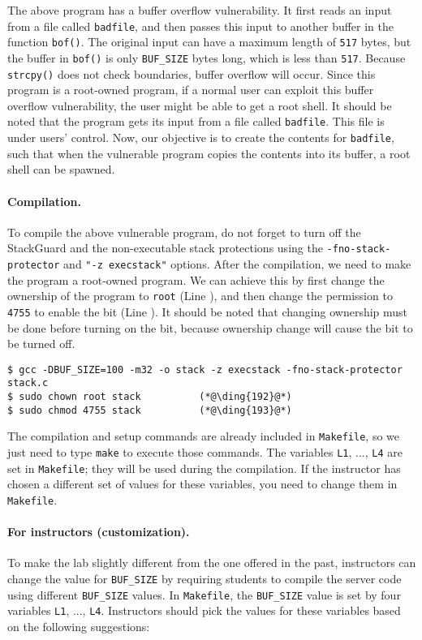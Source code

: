 The above program has a buffer overflow vulnerability. It first 
reads an input from a file called \texttt{badfile}, and then passes this
input to another buffer in the function {\tt bof()}. The 
original input can have a maximum length of \texttt{517} bytes, but the buffer
in {\tt bof()} is only \texttt{BUF\_SIZE} bytes long, which is less than
\texttt{517}. 
Because {\tt strcpy()} does not check
boundaries, buffer overflow will occur.
Since this program is a root-owned \setuid program, if a normal user can exploit
this buffer overflow vulnerability, the user might be 
able to get a root shell.
It should be noted that 
the program gets its input from a file called \texttt{badfile}. This file
is under users' control. Now, our objective is to 
create the contents for \texttt{badfile}, such that when the vulnerable program
copies the contents into its buffer, a root shell can be spawned.


\paragraph{Compilation.}
To compile the above vulnerable program, do not forget to 
turn off the StackGuard and the non-executable stack protections 
using the \texttt{-fno-stack-protector} and \texttt{"-z execstack"} options.
After the compilation, we need to make the program a
root-owned \setuid program. We can achieve this by first change the ownership of the program to
\texttt{root} (Line ), and then change the permission to \texttt{4755} to enable the
\setuid bit (Line ). It should be noted that changing ownership must be done before
turning on the \setuid bit, because ownership change will cause the \setuid bit to be turned
off.


\begin{lstlisting}
$ gcc -DBUF_SIZE=100 -m32 -o stack -z execstack -fno-stack-protector stack.c
$ sudo chown root stack          (*@\ding{192}@*)
$ sudo chmod 4755 stack          (*@\ding{193}@*)
\end{lstlisting}

The compilation and setup commands are already included in \texttt{Makefile}, 
so we just need to type \texttt{make} to execute those commands. 
The variables \texttt{L1}, ..., \texttt{L4} are 
set in \texttt{Makefile}; they will be used during the compilation. 
If the instructor has chosen a different set of values 
for these variables, you need to change them in \texttt{Makefile}.


\paragraph{For instructors (customization).}
To make the lab slightly different from the one offered in the past,
instructors can change the value for \texttt{BUF\_SIZE} by requiring 
students to compile the server code using different \texttt{BUF\_SIZE} values. 
In \texttt{Makefile}, the \texttt{BUF\_SIZE} value is set by
four variables \texttt{L1}, ..., \texttt{L4}. 
Instructors should pick the values for these variables based 
on the following suggestions:

